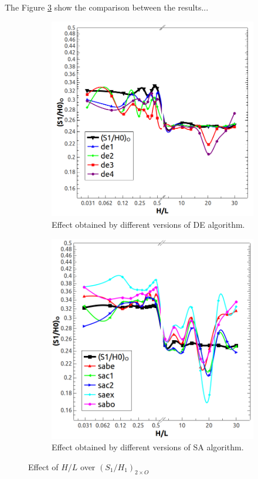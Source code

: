 \documentclass[10pt,fleqn,a4paper,twoside]{article}
\begin{document}
The Figure \ref{figure08} show the comparison between the results...

\begin{figure}[h!]
\centering
	\begin{subfigure}{0.52\textwidth}
		\centering
		\includegraphics[width=1\linewidth]{imgs/5dof/de/g_hl_s1h0_1.png}
		\caption{ {\small Effect obtained by different versions of DE algorithm.}}
		\label{figure08:sub1}
	\end{subfigure}%
	\begin{subfigure}{0.52\textwidth}
		\centering
		\includegraphics[width=1\linewidth]{imgs/5dof/sa/g_hl_s1h0_1.png}
		\caption{ {\small Effect obtained by different versions of SA algorithm.}}
		\label{figure08:sub2}
	\end{subfigure}%
\caption{Effect of $H/L$ over ${(S_{1}/H_{1})_{2\times O}}$}
\label{figure08}
\end{figure}
\end{document}
